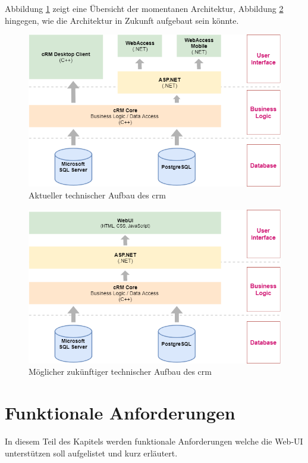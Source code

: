 Abbildung \ref{fig:crm_technical_stack} zeigt eine Übersicht der momentanen Architektur, Abbildung \ref{fig:crm_future_technical_stack} hingegen, wie die Architektur in Zukunft aufgebaut sein könnte.

\begin{figure}
    \centering
    \captionsetup{justification=centering}
    \includegraphics[width=\textwidth]{figures/crm_technical_stack.png}
        \caption{Aktueller technischer Aufbau des \gls{crm}}
        \label{fig:crm_technical_stack}
\end{figure}

\begin{figure}
    \centering
    \captionsetup{justification=centering}
    \includegraphics[width=\textwidth]{figures/crm_future_technical_stack.png}
        \caption{Möglicher zukünftiger technischer Aufbau des \gls{crm}}
        \label{fig:crm_future_technical_stack}
\end{figure}


\section{Funktionale Anforderungen}
In diesem Teil des Kapitels werden funktionale Anforderungen welche die Web-UI unterstützen soll aufgelistet und kurz erläutert.

